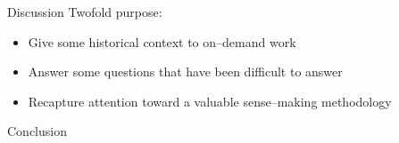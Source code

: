 \documentclass[presentation]{subfiles}
\begin{document}
\begin{frame}{Discussion}
Twofold purpose:
\begin{itemize}
  \item Give some historical context to \alert{on--demand work}
  \item Answer some questions that have been difficult to answer
  \item Recapture attention toward a valuable sense--making methodology
\end{itemize}
\end{frame}

\begin{frame}{Conclusion}

\end{frame}
\end{document}
